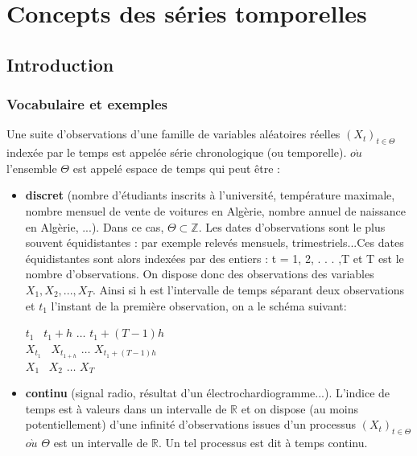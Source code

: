 \documentclass[a4paper,12pt,freqn]{report}
\theoremstyle{plain}
\begin{document}
\chapter{Concepts des s\'{e}ries tomporelles}
\section{Introduction}
\subsection{ Vocabulaire et exemples}
\begin{defi}
Une suite d'observations d'une famille de variables al\'{e}atoires r\'{e}elles $(X_{t})_{t\in\Theta}$ index\'{e}e par le temps est appel\'{e}e s\'{e}rie
chronologique (ou temporelle).
$o\grave{u}$ l'ensemble $\Theta$ est appel\'{e} espace de temps qui peut \^{e}tre :\\
\begin{itemize}
  \item \textbf{discret} (nombre d'\'{e}tudiants inscrits \`{a} l'universit\'{e}, temp\'{e}rature maximale, nombre mensuel de vente de voitures en Alg\`{e}rie, nombre annuel de naissance en Alg\`{e}rie, ...). Dans ce cas, $\Theta\subset\mathbb{Z}$.
Les dates d'observations sont le plus souvent \'{e}quidistantes : par exemple relev\'{e}s mensuels, trimestriels...Ces dates \'{e}quidistantes sont alors index\'{e}es par des entiers : t = 1, 2, . . . ,T et T est le nombre
d'observations. On dispose donc des observations des variables $X_{1},X_{2},...,X_{T}$. Ainsi si h est l'intervalle de temps s\'{e}parant deux
observations et $t_{1}$ l'instant de la premi\`{e}re observation, on a le sch\'{e}ma suivant:
\begin{center}
    $t_{1}$ \ $t_{1}+h$  $\ldots$  $t_{1}+(T-1)h$ \\
     $X_{t_{1}}$  \  $X_{t_{1
     +h}}$ $\ldots$   $X_{t_{1}+(T-1)h}$ \\
     $X_{1}$ \  $X_{2}$  $\ldots$  $X_{T}$
\end{center}

  \item \textbf{continu} (signal radio, r\'{e}sultat d'un \'{e}lectrochardiogramme...). L'indice de temps est \`{a} valeurs dans
un intervalle de $\mathbb{R}$ et on dispose (au moins potentiellement) d'une infinit\'{e} d'observations issues
d'un processus $(X_{t})_{t\in\Theta}$ $o\grave{u}$ $\Theta$ est un intervalle de  $\mathbb{R}$. Un tel processus est dit \`{a} temps continu.
\end{itemize}
\end{defi}
\end{document}
